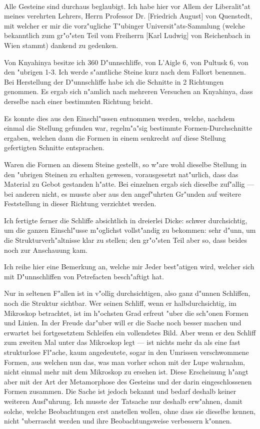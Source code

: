 \documentclass[a4paper, 11pt, oneside]{article}
\begin{document}
\paragraph{}
Alle Gesteine sind durchaus beglaubigt. Ich habe hier vor Allem der Liberalit"at meines verehrten Lehrers, Herrn Professor Dr. [Friedrich August] von Quenstedt, mit welcher er mir die vorz"ugliche T"ubinger Universit"ats-Sammlung (welche bekanntlich zum gr"o"sten Teil vom Freiherrn [Karl Ludwig] von Reichenbach in Wien stammt) dankend zu gedenken.

Von Knyahinya besitze ich 360 D"unnschliffe, von L'Aigle 6, von Pultusk 6, von den "ubrigen 1-3. Ich werde s"amtliche Steine kurz nach dem Fallort benennen. Bei Herstellung der D"unnschliffe habe ich die Schnitte in 2 Richtungen genommen. Es ergab sich n"amlich nach mehreren Versuchen an Knyahinya, dass derselbe nach einer bestimmten Richtung bricht.

Es konnte dies aus den Einschl"ussen entnommen werden, welche, nachdem einmal die Stellung gefunden war, regelm"a"sig bestimmte Formen-Durchschnitte ergaben, welchen dann die Formen in einem senkrecht auf diese Stellung gefertigten Schnitte entsprachen.

Waren die Formen an diesem Steine gestellt, so w"are wohl dieselbe Stellung in den "ubrigen Steinen zu erhalten gewesen, vorausgesetzt nat"urlich, dass das Material zu Gebot gestanden h"atte. Bei einzelnen ergab sich dieselbe zuf"allig --- bei anderen nicht, es musste aber aus den angef"uhrten Gr"unden auf weitere Feststellung in dieser Richtung verzichtet werden.

Ich fertigte ferner die Schliffe absichtlich in dreierlei Dicke: schwer durchsichtig, um die ganzen Einschl"usse m"oglichst vollst"andig zu bekommen: sehr d"unn, um die Strukturverh"altnisse klar zu stellen; den gr"o"sten Teil aber so, dass beides noch zur Anschauung kam.

Ich reihe hier eine Bemerkung an, welche mir Jeder best"atigen wird, welcher sich mit D"unnschliffen von Petrefacten besch"aftigt hat.

Nur in seltenen F"allen ist in v"ollig durchsichtigen, also ganz d"unnen Schliffen, noch die Struktur sichtbar. Wer seinen Schliff, wenn er halbdurchsichtig, im Mikroskop betrachtet, ist im h"ochsten Grad erfreut "uber die sch"onen Formen und Linien. In der Freude dar"uber will er die Sache noch besser machen und erwartet bei fortgesetztem Schleifen ein vollendetes Bild. Aber wenn er den Schliff zum zweiten Mal unter das Mikroskop legt --- ist nichts mehr da als eine fast strukturlose Fl"ache, kaum angedeutete, sogar in den Umrissen verschwommene Formen, aus welchen nun das, was man vorher schon mit der Lupe wahrnahm, nicht einmal mehr mit dem Mikroskop zu ersehen ist. Diese Erscheinung h"angt aber mit der Art der Metamorphose des Gesteins und der darin eingeschlossenen Formen zusammen. Die Sache ist jedoch bekannt und bedarf deshalb keiner weiteren Ausf"uhrung. Ich musste der Tatsache nur deshalb erw"ahnen, damit solche, welche Beobachtungen erst anstellen wollen, ohne dass sie dieselbe kennen, nicht "uberrascht werden und ihre Beobachtungsweise verbessern k"onnen.
\end{document}

